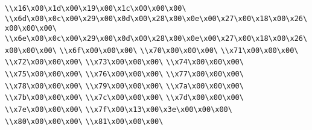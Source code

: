\verb|\\x16\x00\x1d\x00\x19\x00\x1c\x00\x00\x00\|\newline
\verb|\\x6d\x00\x0c\x00\x29\x00\x0d\x00\x28\x00\x0e\x00\x27\x00\x18\x00\x26\x00\x00\x00\|\newline
\verb|\\x6e\x00\x0c\x00\x29\x00\x0d\x00\x28\x00\x0e\x00\x27\x00\x18\x00\x26\x00\x00\x00\|\newline
\verb|\\x6f\x00\x00\x00\|\newline
\verb|\\x70\x00\x00\x00\|\newline
\verb|\\x71\x00\x00\x00\|\newline
\verb|\\x72\x00\x00\x00\|\newline
\verb|\\x73\x00\x00\x00\|\newline
\verb|\\x74\x00\x00\x00\|\newline
\verb|\\x75\x00\x00\x00\|\newline
\verb|\\x76\x00\x00\x00\|\newline
\verb|\\x77\x00\x00\x00\|\newline
\verb|\\x78\x00\x00\x00\|\newline
\verb|\\x79\x00\x00\x00\|\newline
\verb|\\x7a\x00\x00\x00\|\newline
\verb|\\x7b\x00\x00\x00\|\newline
\verb|\\x7c\x00\x00\x00\|\newline
\verb|\\x7d\x00\x00\x00\|\newline
\verb|\\x7e\x00\x00\x00\|\newline
\verb|\\x7f\x00\x13\x00\x3e\x00\x00\x00\|\newline
\verb|\\x80\x00\x00\x00\|\newline
\verb|\\x81\x00\x00\x00\|\newline
